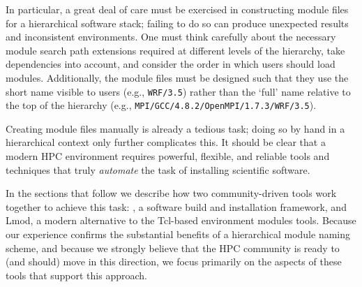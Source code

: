 In particular, a great deal of care must be exercised in constructing module files
for a hierarchical software stack; failing to do so can produce unexpected results
and inconsistent environments. One must think carefully about the necessary module search
path extensions required at different levels of the hierarchy, take dependencies
into account, and consider the order in which users should load modules. Additionally, the
module files must be designed such that they use the short name visible to users
(e.g., \texttt{\small WRF/3.5}) rather than the `full' name relative to the top of
the hierarchy (e.g., \texttt{\small MPI/GCC/4.8.2/OpenMPI/1.7.3/WRF/3.5}).

Creating module files manually is already a tedious task; doing so by hand in a
hierarchical context only further complicates this. It should be clear that a modern 
HPC environment requires powerful, flexible, and reliable tools and techniques that
truly \emph{automate} the task of installing scientific software.

In the sections that follow we describe how two community-driven tools work
together to achieve this task: \easybuild{}, a software build and installation
framework, and Lmod, a modern alternative to the Tcl-based environment modules
tools. Because our experience confirms the substantial benefits of a hierarchical
module naming scheme, and because we strongly believe that the HPC community is
ready to (and should) move in this direction, we focus primarily on the aspects
of these tools that support this approach.
